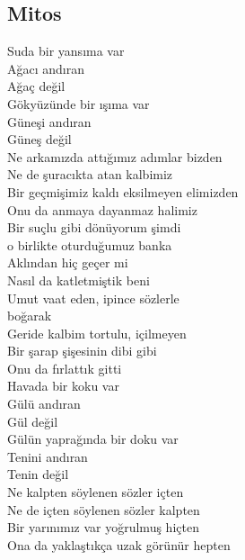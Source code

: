 \subsection{Mitos}

Suda bir yansıma var \\
Ağacı andıran \\
Ağaç değil \\

\noindent\newline
Gökyüzünde bir ışıma var \\
Güneşi andıran \\
Güneş değil \\

\noindent\newline
Ne arkamızda attığımız adımlar bizden \\
Ne de şuracıkta atan kalbimiz \\
Bir geçmişimiz kaldı eksilmeyen elimizden \\
Onu da anmaya dayanmaz halimiz \\

\noindent\newline
Bir suçlu gibi dönüyorum şimdi \\
o birlikte oturduğumuz banka \\
Aklından hiç geçer mi \\
Nasıl da katletmiştik beni \\
Umut vaat eden, ipince sözlerle \\
	boğarak \\
Geride kalbim tortulu, içilmeyen \\
Bir şarap şişesinin dibi gibi \\
Onu da fırlattık gitti \\

\noindent\newline
Havada bir koku var \\
Gülü andıran \\
Gül değil \\

\noindent\newline
Gülün yaprağında bir doku var \\
Tenini andıran \\
Tenin değil \\

\noindent\newline
Ne kalpten söylenen sözler içten \\
Ne de içten söylenen sözler kalpten \\
Bir yarınımız var yoğrulmuş hiçten \\
Ona da yaklaştıkça uzak görünür hepten \\

